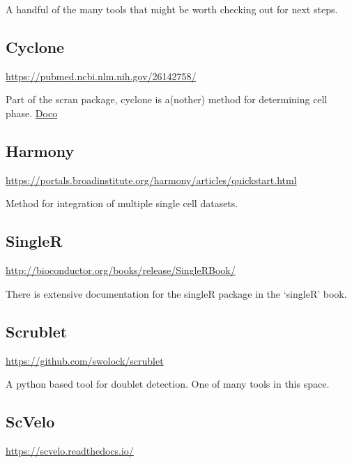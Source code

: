 \documentclass[
]{book}
\begin{document}
A handful of the many tools that might be worth checking out for next steps.

\hypertarget{cyclone}{%
\subsection*{Cyclone}\label{cyclone}}

\url{https://pubmed.ncbi.nlm.nih.gov/26142758/}

Part of the scran package, cyclone is a(nother) method for determining cell phase.
\href{https://rdrr.io/bioc/scran/man/cyclone.html}{Doco}

\hypertarget{harmony}{%
\subsection*{Harmony}\label{harmony}}

\url{https://portals.broadinstitute.org/harmony/articles/quickstart.html}

Method for integration of multiple single cell datasets.

\hypertarget{singler-1}{%
\subsection*{SingleR}\label{singler-1}}

\url{http://bioconductor.org/books/release/SingleRBook/}

There is extensive documentation for the singleR package in the `singleR' book.

\hypertarget{scrublet}{%
\subsection*{Scrublet}\label{scrublet}}

\url{https://github.com/swolock/scrublet}

A python based tool for doublet detection. One of many tools in this space.

\hypertarget{scvelo}{%
\subsection*{ScVelo}\label{scvelo}}

\url{https://scvelo.readthedocs.io/}
\end{document}

